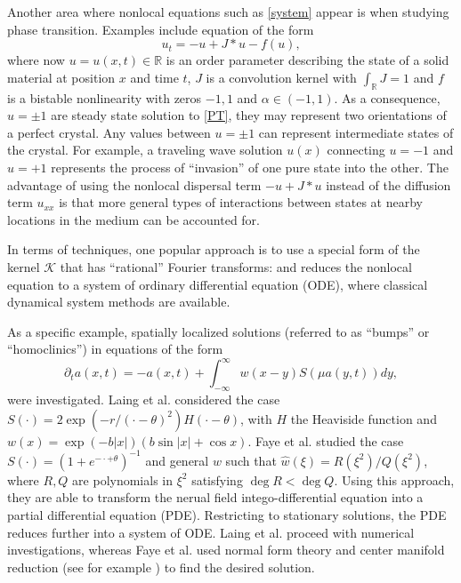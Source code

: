 \documentclass[letterpaper,11pt]{article}
\newcommand{\R}{\mathbb{R}}
\newcommand{\K}{\mathcal{K}}
\numberwithin{equation}{section}
\theoremstyle{plain}
\theoremstyle{remark}
\begin{document}
Another area where nonlocal equations such as \eqref{system} appear is when studying phase transition. Examples include equation of the form
\begin{equation}\label{PT}
u_t = -u+J\ast u - f(u), 
\end{equation}
where now $u = u(x,t) \in \R$ is an order parameter describing the state of a solid material at position $x$ and time $t$, $J$ is a convolution kernel with $\int_\R J=1$ and $f$ is a bistable nonlinearity with zeros $-1,1$ and $\alpha \in (-1,1)$. As a consequence, $u = \pm 1$ are steady state solution to \eqref{PT}, they may represent two orientations of a perfect crystal. Any values between $u=\pm 1$ can represent intermediate states of the crystal. For example, a traveling wave solution $u(x)$ connecting $u=-1$ and $u=+1$ represents the process of ``invasion'' of one pure state into the other. The advantage of using the nonlocal dispersal term $-u+J\ast u$ instead of the diffusion term $u_{xx}$ is that more general types of interactions between states at nearby locations in the medium can be accounted for.

In terms of techniques, one popular approach is to use a special form of the kernel $\K$ that has ``rational'' Fourier transforms: and reduces the nonlocal equation to a system of ordinary differential equation (ODE), where classical dynamical system methods are available.

As a specific example, spatially localized solutions (referred to as ``bumps'' or ``homoclinics'') in equations of the form 
\begin{equation}\label{Laing}
\partial_t a(x,t) = -a(x,t)+\int_{-\infty}^{\infty} w(x-y)S(\mu a(y,t))dy,
\end{equation}
were investigated. Laing et al. \cite{laing2003pde} considered the case $S(\cdot) = 2\exp(-r/(\cdot-\theta)^2)H(\cdot-\theta)$, with $H$ the Heaviside function and $w(x) = \exp(-b|x|)(b\sin |x|+\cos x)$. 
Faye et al. \citep{faye2013localized} studied the case $S(\cdot) = (1+e^{-\cdot+\theta})^{-1}$ and general $w$ such that $\widehat{w}(\xi) = R(\xi^2)/Q(\xi^2)$, where $R,Q$ are polynomials in $\xi^2$ satisfying $\deg R<\deg Q$. Using this approach, they are able to transform the nerual field intego-differential equation into a partial differential equation (PDE). Restricting to stationary solutions, the PDE reduces further into a system of ODE. Laing et al. \citep{laing2003pde} proceed with numerical investigations, whereas Faye et al. \citep{faye2013localized} used normal form theory and center manifold reduction (see for example \cite{haragus2010local}) to find the desired solution.
\end{document}
